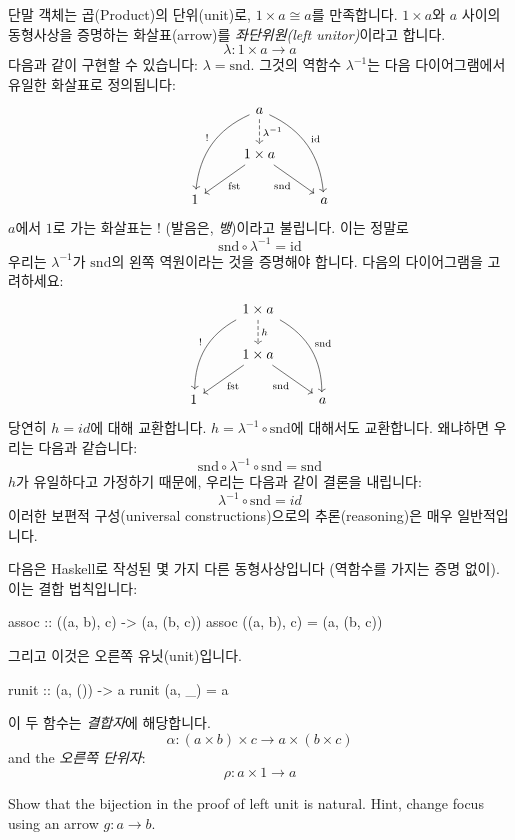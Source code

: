 \documentclass[DaoFP]{subfiles}
\begin{document}
단말 객체는 곱(Product)의 단위(unit)로, $1 \times a \cong a$를 만족합니다. $1 \times a$와 $a$ 사이의 동형사상을 증명하는 화살표(arrow)를 \emph{좌단위원(left unitor)}이라고 합니다.
\[ \lambda \colon 1 \times a \to a \]
다음과 같이 구현할 수 있습니다: $\lambda = \text{snd}$. 그것의 역함수 \(\lambda^{-1}\)는 다음 다이어그램에서 유일한 화살표로 정의됩니다:
\[
 \begin{tikzcd}
 &a
 \arrow[d, dashed, "\lambda^{-1}"]
 \arrow[ddl, bend right, "!"']
 \arrow[ddr, bend left, "\text{id}"]
 \\
 & 1 \times a
  \arrow[dl,  "\text{fst}"]
 \arrow[dr,   "\text{snd}"']
 \\
1 && a
 \end{tikzcd}
 \]
$a$에서 $1$로 가는 화살표는 \index{!}$!$ (발음은, \emph{뱅})이라고 불립니다. 이는 정말로
\[\text{snd} \circ \lambda^{-1} = \text{id} \] 
우리는 $\lambda^{-1}$가 $\text{snd}$의 왼쪽 역원이라는 것을 증명해야 합니다. 다음의 다이어그램을 고려하세요:
\[
 \begin{tikzcd}
 &1 \times a
 \arrow[d, dashed, "h"]
 \arrow[ddl, bend right, "!"']
 \arrow[ddr, bend left, "\text{snd}"]
 \\
 & 1 \times a
  \arrow[dl,  "\text{fst}"]
 \arrow[dr,   "\text{snd}"']
 \\
1 && a
 \end{tikzcd}
 \]
당연히 $h = id$에 대해 교환합니다. $h = \lambda^{-1}  \circ  \text{snd}$에 대해서도 교환합니다. 왜냐하면 우리는 다음과 같습니다:
 \[  \text{snd} \circ \lambda^{-1}  \circ  \text{snd} = \text{snd} \]
$h$가 유일하다고 가정하기 때문에, 우리는 다음과 같이 결론을 내립니다:
\[ \lambda^{-1}  \circ  \text{snd} = id \]
이러한 보편적 구성(universal constructions)으로의 추론(reasoning)은 매우 일반적입니다.

다음은 Haskell로 작성된 몇 가지 다른 동형사상입니다 (역함수를 가지는 증명 없이). 이는 결합 법칙입니다:
\begin{haskell}
assoc :: ((a, b), c) -> (a, (b, c))
assoc ((a, b), c) = (a, (b, c))
\end{haskell}
그리고 이것은 오른쪽 유닛(unit)입니다.
\begin{haskell}
runit :: (a, ()) -> a
runit (a, _) = a
\end{haskell}

이 두 함수는 \emph{결합자}에 해당합니다.
\[ \alpha \colon (a \times b) \times c \to a \times (b \times c) \]
and the \emph{오른쪽 단위자}:
\[ \rho \colon a \times 1 \to a \]

\begin{exercise}
Show that the bijection in the proof of left unit is natural. Hint, change focus using an arrow $g \colon a \to b$.
\end{exercise}
\end{document}

